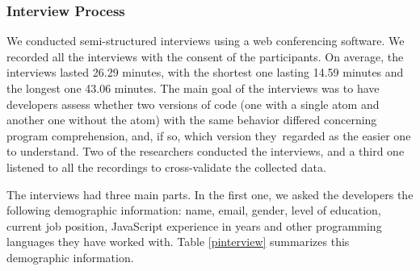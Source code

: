 \subsubsection*{Interview Process} We conducted semi-structured interviews using a web conferencing software. We recorded all the interviews with the consent of the participants. On average, the interviews lasted 26.29 minutes, with the shortest one lasting 14.59 minutes and the longest one 43.06 minutes. The main goal of the interviews was to have developers assess whether two versions of code (one with a single atom and another one without the atom) with the same behavior differed concerning program comprehension, and, if so, which version they\
 regarded as the easier one to understand. Two of the researchers conducted the interviews, and a third one listened to all the recordings to cross-validate the collected data.

The interviews had three main parts. In the first one, we asked the developers the following demographic information: name, email, gender, level of education, current job position, JavaScript experience in years and other programming languages they have worked with.
Table \ref{pinterview} summarizes this demographic information.

